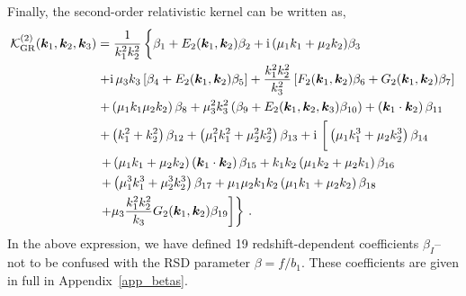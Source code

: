 Finally, the second-order relativistic kernel can be written as, 
\begin{align}
	\ko_\mathrm{GR}^{(2)}(\ka,\kb,\kc) &= \frac{1}{k_1^2 k_2^2} \left\{ \vphantom{\frac{k_1^2 k_2^2}{k_3}} \beta_1 + E_2(\ka,\kb) \beta_2 +\i (\mu_1k_1+\mu_2k_2)\beta_3 \right. \nonumber \\
&\left. + \i \mu_3 k_3\left[ \beta_{4} + E_2(\ka, \kb)\beta_{5}\right] +\frac{k_1^2 k_2^2}{k_3^2} \left[ F_2(\ka,\kb) \beta_{6} + G_2(\ka,\kb) \beta_{7} \right]\right. \nonumber \\
&\left.  + \left( \mu_1 k_1 \mu_2 k_2 \right)\beta_{8} + \mu_3^2 k_3^2 \left(\beta_{9} + E_2(\ka,\kb,\kc) \beta_{10} \right)  + \left(\ka \cdot \kb \right)\beta_{11} \right. \nonumber \\
&\left. + \left( k_1^2 + k_2^2 \right) \beta_{12} + \left( \mu_1^2 k_1^2 + \mu_2^2 k_2^2 \right) \beta_{13} + \i \left[\vphantom{\frac{k_1^2 k_2^2}{k_3}} \left( \mu_1 k_1^3 + \mu_2 k_2^3 \right)\beta_{14} \right. \right. \nonumber \\
&\left. \left. + \left( \mu_1 k_1 + \mu_2 k_2 \right) \left(\ka\cdot\kb \right) \beta_{15} + k_1 k_2 \left(\mu_1 k_2 + \mu_2 k_1 \right) \beta_{16} \right. \right. \nonumber \\
& \left. \left. + \left( \mu_1^3 k_1^3 + \mu_2^3 k_2^3 \right)\beta_{17} + \mu_1 \mu_2 k_1 k_2 \left( \mu_1 k_1 + \mu_2 k_2 \right) \beta_{18} \right. \right. \nonumber \\
& \left. \left. + \mu_3 \frac{k_1^2 k_2^2}{k_3} G_2(\ka,\kb) \beta_{19} \right] \right\}\,.
\end{align}
In the above expression, we have defined 19 redshift-dependent coefficients $\beta_I$-- not to be confused with the RSD parameter $\beta = f / b_1$. These coefficients are given in full in Appendix~\ref{app_betas}. 


